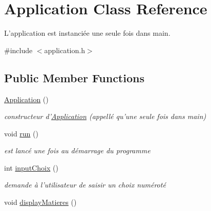 \hypertarget{class_application}{\section{Application Class Reference}
\label{class_application}
}


L'application est instanciée une seule fois dans main.  




{\ttfamily \#include $<$application.\-h$>$}

\subsection*{Public Member Functions}
\begin{DoxyCompactItemize}
\item 
\hypertarget{class_application_afa8cc05ce6b6092be5ecdfdae44e05f8}{\hyperlink{class_application_afa8cc05ce6b6092be5ecdfdae44e05f8}{Application} ()}\label{class_application_afa8cc05ce6b6092be5ecdfdae44e05f8}

\begin{DoxyCompactList}\small\item\em constructeur d'\hyperlink{class_application}{Application} (appellé qu'une seule fois dans main) \end{DoxyCompactList}\item 
\hypertarget{class_application_a68965449404743bf1add056784d6cf81}{void \hyperlink{class_application_a68965449404743bf1add056784d6cf81}{run} ()}\label{class_application_a68965449404743bf1add056784d6cf81}

\begin{DoxyCompactList}\small\item\em est lancé une fois au démarrage du programme \end{DoxyCompactList}\item 
\hypertarget{class_application_abc2e709f05909ef74356f38115c6a4f9}{int \hyperlink{class_application_abc2e709f05909ef74356f38115c6a4f9}{input\-Choix} ()}\label{class_application_abc2e709f05909ef74356f38115c6a4f9}

\begin{DoxyCompactList}\small\item\em demande à l'utilisateur de saisir un choix numéroté \end{DoxyCompactList}\item 
\hypertarget{class_application_a1e9ccebafcd28f35ea057b97f07e40cd}{void \hyperlink{class_application_a1e9ccebafcd28f35ea057b97f07e40cd}{display\-Matieres} ()}\label{class_application_a1e9ccebafcd28f35ea057b97f07e40cd}


\end{DoxyCompactItemize}
